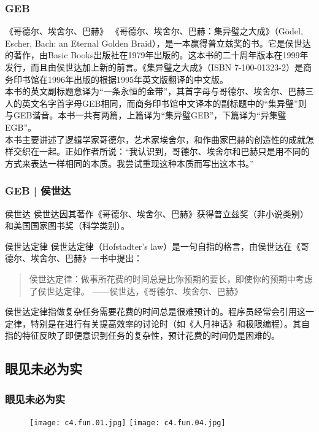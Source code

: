 \begin{frame}
  \frametitle{GEB}
  \begin{block}{《哥德尔、埃舍尔、巴赫》}
    《哥德尔、埃舍尔、巴赫：集异璧之大成》（Gödel, Escher, Bach: an Eternal Golden Braid），是一本赢得普立兹奖的书。它是侯世达的著作，由Basic Books出版社在1979年出版的。这本书的二十周年版本在1999年发行，而且由侯世达加上新的前言。《集异璧之大成》（ISBN 7-100-01323-2）是商务印书馆在1996年出版的根据1995年英文版翻译的中文版。\\
    \vspace{0.3em}
本书的英文副标题意译为“一条永恒的金带”，其首字母与哥德尔、埃舍尔、巴赫三人的英文名字首字母GEB相同，而商务印书馆中文译本的副标题中的“集异璧”则与GEB谐音。本书一共有两篇，上篇译为“集异璧GEB”，下篇译为“异集璧EGB”。 \\
    \vspace{0.3em}
本书主要讲述了逻辑学家哥德尔，艺术家埃舍尔，和作曲家巴赫的创造性的成就怎样交织在一起。正如作者所说：“我认识到，哥德尔、埃舍尔和巴赫只是用不同的方式来表达一样相同的本质。我尝试重现这种本质而写出这本书。”
  \end{block}
\end{frame}

\begin{frame}
  \frametitle{GEB | 侯世达}
  \begin{block}{侯世达}
    侯世达因其著作《哥德尔、埃舍尔、巴赫》获得普立兹奖（非小说类别）和美国国家图书奖（科学类别）。
  \end{block}
  \begin{block}{\alert{侯世达定律}}
    侯世达定律（Hofstadter's law）是一句自指的格言，由侯世达在《哥德尔、埃舍尔、巴赫》一书中提出：
    \begin{quote}
    侯世达定律：做事所花费的时间总是比你预期的要长，即使你的预期中考虑了侯世达定律。 ——侯世达，《哥德尔、埃舍尔、巴赫》
    \end{quote}
侯世达定律指做复杂任务需要花费的时间总是很难预计的。程序员经常会引用这一定律，特别是在进行有关提高效率的讨论时（如《人月神话》和极限编程）。其自指的特征反映了即便意识到任务的复杂性，预计花费的时间仍是困难的。
  \end{block}
\end{frame}

\subsection{眼见未必为实}
\begin{frame}
  \frametitle{眼见未必为实}
  \begin{figure}
    \centering
    \texttt{[image: c4.fun.01.jpg]}\quad
    \texttt{[image: c4.fun.04.jpg]}
  \end{figure}
\end{frame}

